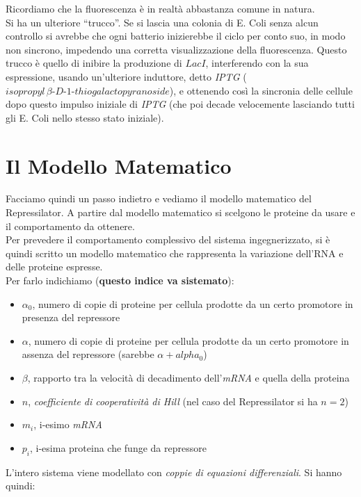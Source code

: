 \documentclass[a4paper,12pt, oneside]{book}
\begin{document}
Ricordiamo che la fluorescenza è in realtà abbastanza comune in natura.\\
Si ha un ulteriore ``trucco''. Se si lascia una colonia di E. Coli senza alcun
controllo si avrebbe che ogni batterio inizierebbe il ciclo per conto suo, in
modo non sincrono, impedendo una corretta visualizzazione della
fluorescenza. Questo trucco è quello di inibire la produzione di $LacI$,
interferendo con la sua espressione, usando
un'ulteriore induttore, detto \textit{IPTG} ($isopropyl
\,\beta\mbox{-}D\mbox{-}1\mbox{-}thiogalactopyranoside$), e ottenendo così la
sincronia delle  
cellule dopo questo impulso iniziale di \textit{IPTG} (che poi decade
velocemente lasciando tutti gli E. Coli nello stesso stato iniziale).
\section{Il Modello Matematico}
Facciamo quindi un passo indietro e vediamo il modello matematico del
Repressilator. A partire dal modello matematico si scelgono le proteine da usare
e il comportamento da ottenere.\\
Per prevedere il comportamento complessivo del sistema ingegnerizzato, si è
quindi scritto un modello matematico che rappresenta la variazione 
dell'RNA e delle proteine espresse.\\
Per farlo indichiamo (\textbf{questo indice va sistemato}):
\begin{itemize}
  \item $\alpha_0$, numero di copie di proteine per cellula prodotte da un certo
  promotore in presenza del repressore
  \item $\alpha$, numero di copie di proteine per cellula prodotte da un certo
  promotore in assenza del repressore (sarebbe $\alpha+alpha_0$)
  \item $\beta$, rapporto tra la velocità di decadimento dell'\textit{mRNA} e
  quella della proteina 
  \item $n$, \textit{coefficiente di cooperatività di Hill} (nel caso del
  Repressilator si ha $n=2$)
  \item $m_i$, i-esimo \textit{mRNA}
  \item $p_i$, i-esima proteina che funge da repressore
\end{itemize}
L'intero sistema viene modellato con \textit{coppie di equazioni
  differenziali}. Si hanno quindi: 
\end{document}
